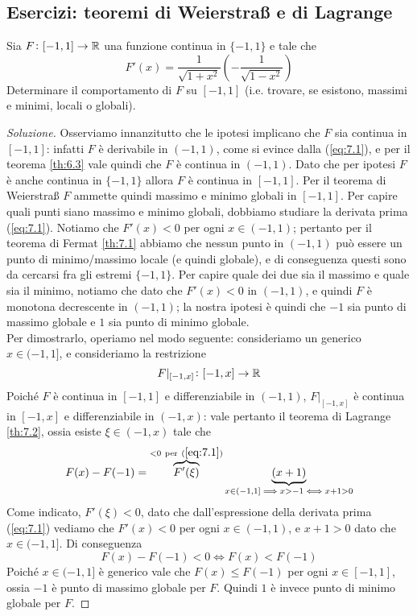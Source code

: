 \subsection{Esercizi: teoremi di \texorpdfstring{Weierstra{\ss}}{Weierstraß} e di Lagrange}
\begin{exercise}
    \label{ex:7.1}
    Sia $F\colon [-1, 1]\to \amsbb{R}$ una funzione continua in $\{-1, 1\}$ e tale che
    \begin{equation}
        \label{eq:7.1}
        F'(x) = \frac{1}{\sqrt{1+x^2}}\left(-\frac{1}{\sqrt{1-x^2}}\right)
    \end{equation}
    Determinare il comportamento di $F$ su $[-1, 1]$ (i.e. trovare, se esistono, massimi e minimi, locali o globali).
\end{exercise}
\begin{proof}[Soluzione]
    Osserviamo innanzitutto che le ipotesi implicano che $F$ sia continua in $[-1, 1]$: infatti $F$ è derivabile in $(-1, 1)$, come si evince dalla (\ref{eq:7.1}), e per il teorema \ref{th:6.3} vale quindi che $F$ è continua in $(-1, 1)$. Dato che per ipotesi $F$ è anche continua in $\{-1, 1\}$ allora $F$ è continua in $[-1, 1]$. Per il teorema di Weierstra{\ss} $F$ ammette quindi massimo e minimo globali in $[-1, 1]$. Per capire quali punti siano massimo e minimo globali, dobbiamo studiare la derivata prima (\ref{eq:7.1}). Notiamo che $F'(x)<0$ per ogni $x\in(-1,1)$; pertanto per il teorema di Fermat \ref{th:7.1} abbiamo che nessun punto in $(-1,1)$ può essere un punto di minimo/massimo locale (e quindi globale), e di conseguenza questi sono da cercarsi fra gli estremi $\{-1, 1\}$. Per capire quale dei due sia il massimo e quale sia il minimo, notiamo che dato che $F'(x)<0$ in $(-1, 1)$, e quindi $F$ è monotona decrescente in $(-1,1)$; la nostra ipotesi è quindi che $-1$ sia punto di massimo globale e $1$ sia punto di minimo globale. \\
    Per dimostrarlo, operiamo nel modo seguente: consideriamo un generico $x\in(-1,1]$, e consideriamo la restrizione
    \[
    F|_{[-1,x]}\colon [-1,x]\to \amsbb{R}
    \]
    Poiché $F$ è continua in $[-1, 1]$ e differenziabile in $(-1, 1)$, $F|_{[-1, x]}$ è continua in $[-1, x]$ e differenziabile in $(-1, x)$: vale pertanto il teorema di Lagrange \ref{th:7.2}, ossia esiste $\xi\in(-1, x)$ tale che
    \[
    F(x)-F(-1) = \overbrace{F'(\xi)}^{<0 \ \text{per} \ (\ref{eq:7.1})}\underbrace{(x+1)}_{x\in(-1, 1] \implies x>-1 \iff x+1>0 }
    \]
    Come indicato, $F'(\xi)<0$, dato che dall'espressione della derivata prima (\ref{eq:7.1}) vediamo che $F'(x)<0$ per ogni $x\in(-1,1)$, e $x+1>0$ dato che $x\in(-1, 1]$. Di conseguenza
    \[
    F(x)-F(-1)<0 \iff F(x)<F(-1)
    \]
    Poiché $x\in(-1,1]$ è generico vale che $F(x)\le F(-1)$ per ogni $x\in[-1,1]$, ossia $-1$ è punto di massimo globale per $F$. Quindi $1$ è invece punto di minimo globale per $F$.
\end{proof}
